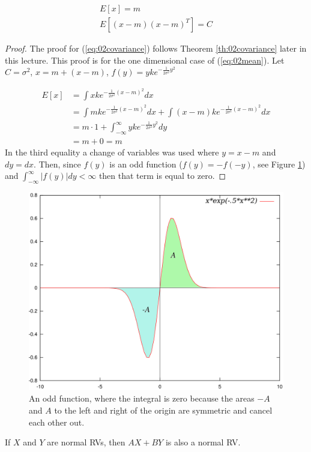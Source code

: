 \documentclass[lecture,12pt,]{pcms-l}
\begin{document}
\begin{theorem}
\label{th:02mean}
\begin{align}
\label{eq:02mean}
E[x] = m \\
\label{eq:02covariance}
E[(x-m)(x-m)^T] = C
\end{align}
\end{theorem}
\begin{proof}
The proof for (\ref{eq:02covariance}) follows Theorem \ref{th:02covariance} later in this lecture. This proof is for the one dimensional case of (\ref{eq:02mean}). Let $C=\sigma^2$, $x=m+(x-m)$, $f(y)=yke^{-\frac{1}{2\sigma^2}y^2}$

\begin{align*}
E[x] &= \int xke^{-\frac{1}{2\sigma^2}(x-m)^2}dx \\
&= \int mke^{-\frac{1}{2\sigma^2}(x-m)^2}dx + \int(x-m)ke^{-\frac{1}{2\sigma^2}(x-m)^2}dx \\
&= m \cdot 1 + \int_{-\infty}^\infty yke^{-\frac{1}{2\sigma^2}y^2}dy \\
&= m + 0 = m
\end{align*}
In the third equality a change of variables was used where $y=x-m$ and $dy=dx$. Then, since $f(y)$ is an odd function ($f(y)=-f(-y)$, see Figure \ref{fig:02oddFunction}) and $\int_{-\infty}^\infty|f(y)|dy < \infty$ then that term is equal to zero.
\end{proof}
\begin{figure}[ht!]
	\centering
	\includegraphics[width=.5\textwidth]{images/02oddFunction}
	\caption{An odd function, where the integral is zero because the areas $-A$ and $A$ to the left and right of the origin are symmetric and cancel each other out.}
	\label{fig:02oddFunction}
\end{figure}

\begin{theorem}
If $X$ and $Y$ are normal RVs, then $AX+BY$ is also a normal RV.
\end{theorem}
\end{document}
